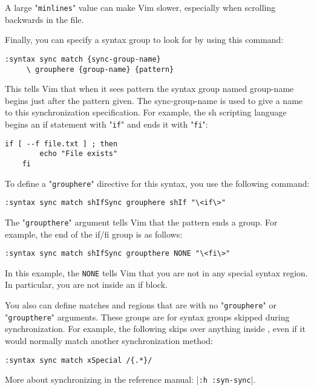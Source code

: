 A large "\verb!minlines!" value can make Vim slower, especially when scrolling backwards in the file.

Finally, you can specify a syntax group to look for by using this command:

\begin{Verbatim}[samepage=true]
 :syntax sync match {sync-group-name}
     \ grouphere {group-name} {pattern}
\end{Verbatim}

This tells Vim that when it sees {pattern} the syntax group named {group-name} begins just after the pattern given.
The {sync-group-name} is used to give a name to this synchronization specification.
For example, the sh scripting language begins an if statement with "\verb!if!" and ends it with "\verb!fi!":

\begin{Verbatim}[samepage=true]
    if [ --f file.txt ] ; then 
        echo "File exists" 
    fi 
\end{Verbatim}

To define a "\verb!grouphere!" directive for this syntax, you use the following command:

\begin{Verbatim}[samepage=true]
 :syntax sync match shIfSync grouphere shIf "\<if\>"
\end{Verbatim}

The "\verb!groupthere!" argument tells Vim that the pattern ends a group.
For example, the end of the if/fi group is as follows:

\begin{Verbatim}[samepage=true]
 :syntax sync match shIfSync groupthere NONE "\<fi\>"
\end{Verbatim}

In this example, the \verb!NONE! tells Vim that you are not in any special syntax region.
In particular, you are not inside an if block.

You also can define matches and regions that are with no "\verb!grouphere!" or "\verb!groupthere!" arguments.
These groups are for syntax groups skipped during synchronization.
For example, the following skips over anything inside {}, even if it would normally match another synchronization method:

\begin{Verbatim}[samepage=true]
 :syntax sync match xSpecial /{.*}/
\end{Verbatim}

More about synchronizing in the reference manual: |\verb!:h :syn-sync!|.
